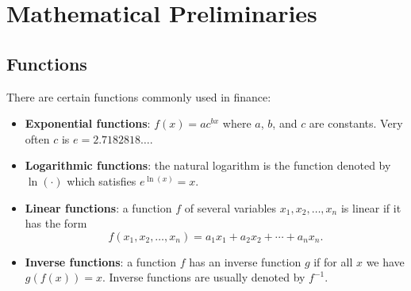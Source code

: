 \chapter{Mathematical Preliminaries}
\section{Functions}
There are certain functions commonly used in finance:

\begin{itemize}
    \item \textbf{Exponential functions}: \( f(x) = ac^{bx} \) where \( a \), \( b \), and \( c \) are constants. Very often \( c \) is \( e = 2.7182818\ldots \).
    \item \textbf{Logarithmic functions}: the natural logarithm is the function denoted by \( \ln(\cdot) \) which satisfies \( e^{\ln(x)} = x \).
    \item \textbf{Linear functions}: a function \( f \) of several variables \( x_1, x_2, \ldots, x_n \) is linear if it has the form
    \[
    f(x_1, x_2, \ldots, x_n) = a_1x_1 + a_2x_2 + \cdots + a_nx_n.
    \]
    \item \textbf{Inverse functions}: a function \( f \) has an inverse function \( g \) if for all \( x \) we have \( g(f(x)) = x \). Inverse functions are usually denoted by \( f^{-1} \).
\end{itemize}



